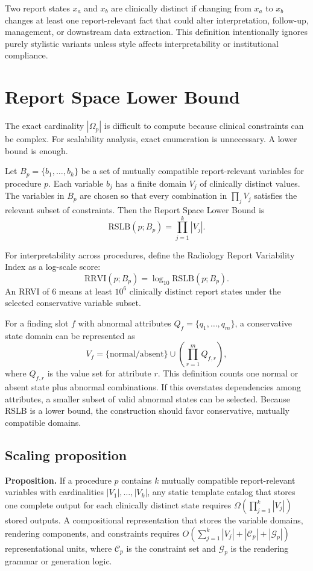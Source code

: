 \documentclass[11pt]{article}
\begin{document}
Two report states $x_a$ and $x_b$ are clinically distinct if changing from $x_a$ to $x_b$ changes at least one report-relevant fact that could alter interpretation, follow-up, management, or downstream data extraction. This definition intentionally ignores purely stylistic variants unless style affects interpretability or institutional compliance.

\section{Report Space Lower Bound}

The exact cardinality $|\Omega_p|$ is difficult to compute because clinical constraints can be complex. For scalability analysis, exact enumeration is unnecessary. A lower bound is enough.

Let $B_p = \{b_1,\ldots,b_k\}$ be a set of mutually compatible report-relevant variables for procedure $p$. Each variable $b_j$ has a finite domain $V_j$ of clinically distinct values. The variables in $B_p$ are chosen so that every combination in $\prod_j V_j$ satisfies the relevant subset of constraints. Then the Report Space Lower Bound is
\begin{equation}
    \mathrm{RSLB}(p;B_p) = \prod_{j=1}^{k} |V_j|.
\end{equation}

For interpretability across procedures, define the Radiology Report Variability Index as a log-scale score:
\begin{equation}
    \mathrm{RRVI}(p;B_p) = \log_{10} \mathrm{RSLB}(p;B_p).
\end{equation}
An RRVI of 6 means at least $10^6$ clinically distinct report states under the selected conservative variable subset.

For a finding slot $f$ with abnormal attributes $Q_f = \{q_1,\ldots,q_m\}$, a conservative state domain can be represented as
\begin{equation}
    V_f = \{\mathrm{normal/absent}\} \cup \left(\prod_{r=1}^{m} Q_{f,r}\right),
\end{equation}
where $Q_{f,r}$ is the value set for attribute $r$. This definition counts one normal or absent state plus abnormal combinations. If this overstates dependencies among attributes, a smaller subset of valid abnormal states can be selected. Because RSLB is a lower bound, the construction should favor conservative, mutually compatible domains.

\subsection{Scaling proposition}
\textbf{Proposition.} If a procedure $p$ contains $k$ mutually compatible report-relevant variables with cardinalities $|V_1|,\ldots,|V_k|$, any static template catalog that stores one complete output for each clinically distinct state requires $\Omega(\prod_{j=1}^k |V_j|)$ stored outputs. A compositional representation that stores the variable domains, rendering components, and constraints requires $O(\sum_{j=1}^k |V_j| + |\mathcal{C}_p| + |\mathcal{G}_p|)$ representational units, where $\mathcal{C}_p$ is the constraint set and $\mathcal{G}_p$ is the rendering grammar or generation logic.
\end{document}
